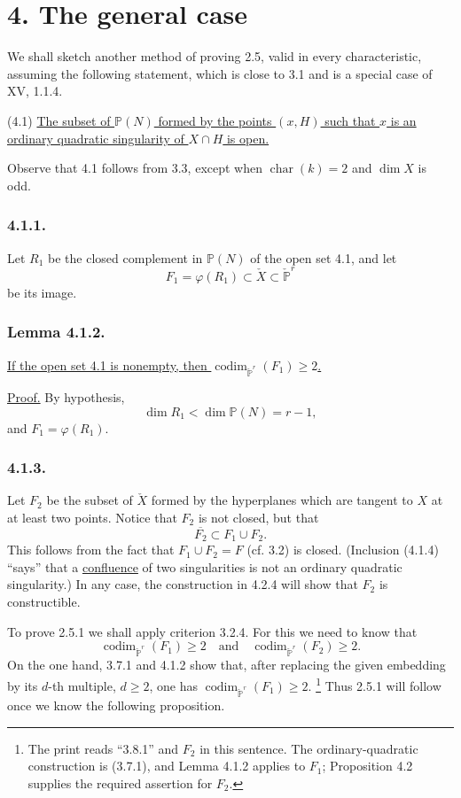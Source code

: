 \section*{4. The general case}

We shall sketch another method of proving 2.5, valid in every
characteristic, assuming the following statement, which is close to
3.1 and is a special case of XV, 1.1.4.

\medskip
\noindent(4.1) \underline{The subset of $\mathbb P(N)$ formed by the
points $(x,H)$ such that $x$ is an ordinary quadratic singularity of
$X\cap H$ is open.}

Observe that 4.1 follows from 3.3, except when
$\operatorname{char}(k)=2$ and $\dim X$ is odd.

\subsubsection*{4.1.1.}
Let $R_1$ be the closed complement in $\mathbb P(N)$ of the open set
4.1, and let
\[
F_1=\varphi(R_1)\subset\check X\subset\check{\mathbb P}^{r}
\]
be its image.

\subsubsection*{Lemma 4.1.2.}
\underline{If the open set 4.1 is nonempty, then
$\operatorname{codim}_{\check{\mathbb P}^{r}}(F_1)\geq2$.}

\noindent\underline{Proof.}
By hypothesis,
\[
\dim R_1<\dim\mathbb P(N)=r-1,
\]
and $F_1=\varphi(R_1)$.

\subsubsection*{4.1.3.}
Let $F_2$ be the subset of $\check X$ formed by the hyperplanes which
are tangent to $X$ at at least two points.  Notice that $F_2$ is not
closed, but that
\begin{equation}\tag{4.1.4}
\overline{F_2}\subset F_1\cup F_2.
\end{equation}
This follows from the fact that $F_1\cup F_2=F$ (cf. 3.2) is closed.
(Inclusion (4.1.4) ``says'' that a \underline{confluence} of two
singularities is not an ordinary quadratic singularity.)  In any
case, the construction in 4.2.4 will show that $F_2$ is constructible.

To prove 2.5.1 we shall apply criterion 3.2.4.  For this we need to
know that
\[
\operatorname{codim}_{\check{\mathbb P}^{r}}(F_1)\geq2
\quad\text{and}\quad
\operatorname{codim}_{\check{\mathbb P}^{r}}(F_2)\geq2.
\]
On the one hand, 3.7.1 and 4.1.2 show that, after replacing the given
embedding by its $d$-th multiple, $d\geq2$, one has
$\operatorname{codim}_{\check{\mathbb P}^{r}}(F_1)\geq2$.
\footnote{The print reads ``3.8.1'' and $F_2$ in this sentence.  The
ordinary-quadratic construction is (3.7.1), and Lemma 4.1.2 applies
to $F_1$; Proposition 4.2 supplies the required assertion for $F_2$.}
Thus 2.5.1 will follow once we know the following proposition.


